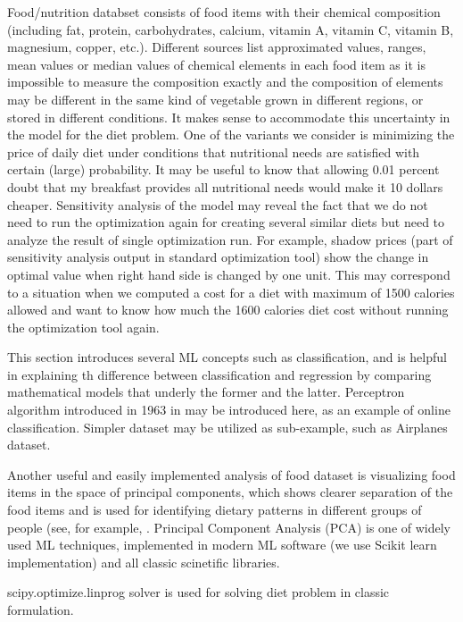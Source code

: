 Food/nutrition databset consists of food items with their chemical composition (including fat, protein, carbohydrates, calcium, vitamin A, vitamin C, vitamin B, magnesium, copper, etc.). Different sources list approximated values, ranges, mean values or median values of chemical elements in each food item as it is impossible to measure the composition exactly and the composition of elements may be different in the same kind of vegetable grown in different regions, or stored in different conditions. It makes sense to accommodate this uncertainty in the model for the diet problem. One of the variants we consider is minimizing the price of daily diet under conditions that nutritional needs are satisfied with certain (large) probability. It may be useful to know that allowing 0.01 percent  doubt that my breakfast provides all nutritional needs would make it 10 dollars  cheaper. 
Sensitivity analysis of the model may reveal the fact that we do not need to run the optimization again for creating several similar diets but need to analyze the result of single optimization run. For example, shadow prices (part of sensitivity analysis output in standard optimization tool) show the change in optimal value when right hand side is changed by one unit. This may correspond to a situation when we computed a cost for a diet with maximum of 1500 calories allowed and want to know how much the 1600 calories diet cost without running the optimization tool again.  


This section introduces several ML concepts such as classification, and is helpful in explaining th difference between classification and regression by comparing mathematical models that underly the former and the latter. Perceptron algorithm introduced in 1963 in \cite{ABR} may be introduced here, as an example of online classification. Simpler dataset may be utilized as sub-example, such as Airplanes dataset.

Another useful and easily implemented analysis  of food dataset is visualizing food items in the space of principal components,  which shows clearer separation of the food items and is used for identifying dietary patterns in different groups of people (see, for example, \cite{CS}. Principal Component Analysis (PCA) is one of widely used ML techniques, implemented in modern ML software (we use Scikit learn implementation) and all classic scinetific libraries. 

scipy.optimize.linprog solver is used for solving diet problem in classic formulation.


